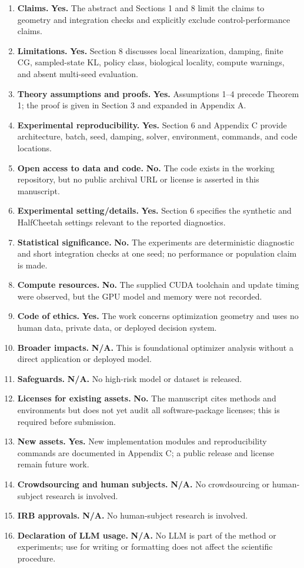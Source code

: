 \documentclass{article}
\begin{document}
\begin{enumerate}[leftmargin=*]
\item \textbf{Claims.} \textbf{Yes.} The abstract and Sections 1 and 8 limit the claims to geometry and integration checks and explicitly exclude control-performance claims.
\item \textbf{Limitations.} \textbf{Yes.} Section 8 discusses local linearization, damping, finite CG, sampled-state KL, policy class, biological locality, compute warnings, and absent multi-seed evaluation.
\item \textbf{Theory assumptions and proofs.} \textbf{Yes.} Assumptions 1--4 precede Theorem 1; the proof is given in Section 3 and expanded in Appendix A.
\item \textbf{Experimental reproducibility.} \textbf{Yes.} Section 6 and Appendix C provide architecture, batch, seed, damping, solver, environment, commands, and code locations.
\item \textbf{Open access to data and code.} \textbf{No.} The code exists in the working repository, but no public archival URL or license is asserted in this manuscript.
\item \textbf{Experimental setting/details.} \textbf{Yes.} Section 6 specifies the synthetic and HalfCheetah settings relevant to the reported diagnostics.
\item \textbf{Statistical significance.} \textbf{No.} The experiments are deterministic diagnostic and short integration checks at one seed; no performance or population claim is made.
\item \textbf{Compute resources.} \textbf{No.} The supplied CUDA toolchain and update timing were observed, but the GPU model and memory were not recorded.
\item \textbf{Code of ethics.} \textbf{Yes.} The work concerns optimization geometry and uses no human data, private data, or deployed decision system.
\item \textbf{Broader impacts.} \textbf{N/A.} This is foundational optimizer analysis without a direct application or deployed model.
\item \textbf{Safeguards.} \textbf{N/A.} No high-risk model or dataset is released.
\item \textbf{Licenses for existing assets.} \textbf{No.} The manuscript cites methods and environments but does not yet audit all software-package licenses; this is required before submission.
\item \textbf{New assets.} \textbf{Yes.} New implementation modules and reproducibility commands are documented in Appendix C; a public release and license remain future work.
\item \textbf{Crowdsourcing and human subjects.} \textbf{N/A.} No crowdsourcing or human-subject research is involved.
\item \textbf{IRB approvals.} \textbf{N/A.} No human-subject research is involved.
\item \textbf{Declaration of LLM usage.} \textbf{N/A.} No LLM is part of the method or experiments; use for writing or formatting does not affect the scientific procedure.
\end{enumerate}
\end{document}
